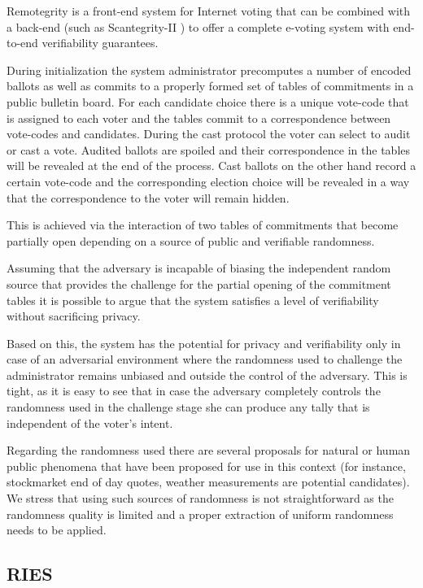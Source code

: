 Remotegrity \cite{remotegrity} is a front-end system for Internet
voting that can be combined with a back-end (such as Scantegrity-II
\cite{scantegrity2} ) to offer a complete e-voting system with
end-to-end verifiability guarantees.

During initialization the system administrator precomputes a number of
encoded ballots as well as commits to a properly formed set of tables
of commitments in a public bulletin board. For each candidate choice
there is a unique vote-code that is assigned to each voter and the
tables commit to a correspondence between vote-codes and
candidates. During the cast protocol the voter can select to audit or
cast a vote. Audited ballots are spoiled and their correspondence in
the tables will be revealed at the end of the process. Cast ballots on
the other hand record a certain vote-code and the corresponding
election choice will be revealed in a way that the correspondence to
the voter will remain hidden.

This is achieved via the interaction of two tables of commitments that
become partially open depending on a source of public and verifiable
randomness.

Assuming that the adversary is incapable of biasing the independent
random source that provides the challenge for the partial opening of
the commitment tables it is possible to argue that the system
satisfies a level of verifiability without sacrificing privacy.

Based on this, the system has the potential for privacy and
verifiability only in case of an adversarial environment where the
randomness used to challenge the administrator remains unbiased and
outside the control of the adversary. This is tight, as it is easy to
see that in case the adversary completely controls the randomness used
in the challenge stage she can produce any tally that is independent
of the voter's intent.

Regarding the randomness used there are several proposals for natural
or human public phenomena that have been proposed for use in this
context (for instance, stockmarket end of day quotes, weather
measurements are potential candidates). We stress that using such
sources of randomness is not straightforward as the randomness quality
is limited and a proper extraction of uniform randomness needs to be
applied.

\subsection{RIES}

